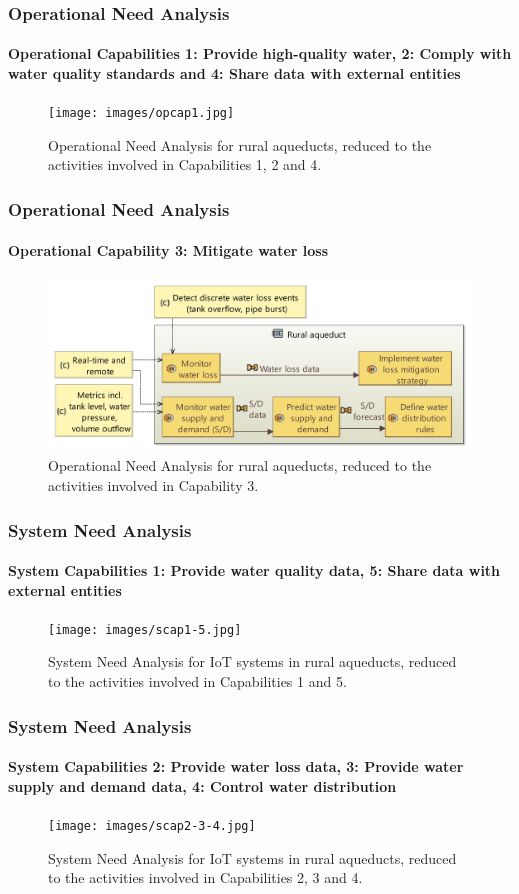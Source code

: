 \documentclass{beamer}
\begin{document}
\begin{frame}
    \frametitle{\small Operational Need Analysis}
    \framesubtitle{Operational Capabilities 1: Provide high-quality water, 2: Comply with water quality standards and 4: Share data with external entities}

    \begin{figure}
        \centering
        \texttt{[image: images/opcap1.jpg]}
        \caption{Operational Need Analysis for rural aqueducts, reduced to the activities involved in Capabilities 1, 2 and 4.}
    \end{figure}
\end{frame}

\begin{frame}
    \frametitle{\small Operational Need Analysis}
    \framesubtitle{Operational Capability 3: Mitigate water loss}

    \begin{figure}
        \centering
        \includegraphics[width=\textwidth]{images/opcap3.jpg}
        \caption{Operational Need Analysis for rural aqueducts, reduced to the activities involved in Capability 3.}
    \end{figure}
\end{frame}

\begin{frame}
    \frametitle{\small System Need Analysis}
    \framesubtitle{System Capabilities 1: Provide water quality data, 5: Share data with external entities}

    \begin{figure}
        \centering
        \texttt{[image: images/scap1-5.jpg]}
        \caption{System Need Analysis for IoT systems in rural aqueducts, reduced to the activities involved in Capabilities 1 and 5.}
    \end{figure}
\end{frame}

\begin{frame}
    \frametitle{\small System Need Analysis}
    \framesubtitle{System Capabilities 2: Provide water loss data, 3: Provide water supply and demand data, 4: Control water distribution}

    \begin{figure}
        \centering
        \texttt{[image: images/scap2-3-4.jpg]}
        \caption{System Need Analysis for IoT systems in rural aqueducts, reduced to the activities involved in Capabilities 2, 3 and 4.}
    \end{figure}
\end{frame}
\end{document}
